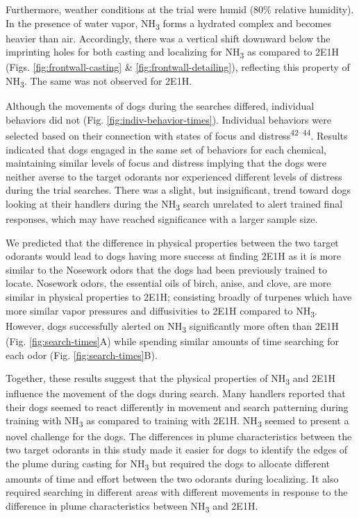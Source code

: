 \documentclass[
]{article}
\begin{document}
Furthermore, weather conditions at the trial were humid (80\% relative humidity). In the presence of water vapor, NH\textsubscript{3} forms a hydrated complex and becomes heavier than air. Accordingly, there was a vertical shift downward below the imprinting holes for both casting and localizing for NH\textsubscript{3} as compared to 2E1H (Figs. \ref{fig:frontwall-casting} \& \ref{fig:frontwall-detailing}), reflecting this property of NH\textsubscript{3}. The same was not observed for 2E1H.

Although the movements of dogs during the searches differed, individual behaviors did not (Fig. \ref{fig:indiv-behavior-times}). Individual behaviors were selected based on their connection with states of focus and distress\textsuperscript{42--44}. Results indicated that dogs engaged in the same set of behaviors for each chemical, maintaining similar levels of focus and distress implying that the dogs were neither averse to the target odorants nor experienced different levels of distress during the trial searches. There was a slight, but insignificant, trend toward dogs looking at their handlers during the NH\textsubscript{3} search unrelated to alert trained final responses, which may have reached significance with a larger sample size.

We predicted that the difference in physical properties between the two target odorants would lead to dogs having more success at finding 2E1H as it is more similar to the Nosework odors that the dogs had been previously trained to locate. Nosework odors, the essential oils of birch, anise, and clove, are more similar in physical properties to 2E1H; consisting broadly of turpenes which have more similar vapor pressures and diffusivities to 2E1H compared to NH\textsubscript{3}. However, dogs successfully alerted on NH\textsubscript{3} significantly more often than 2E1H (Fig. \ref{fig:search-times}A) while spending similar amounts of time searching for each odor (Fig. \ref{fig:search-times}B).

Together, these results suggest that the physical properties of NH\textsubscript{3} and 2E1H influence the movement of the dogs during search. Many handlers reported that their dogs seemed to react differently in movement and search patterning during training with NH\textsubscript{3} as compared to training with 2E1H. NH\textsubscript{3} seemed to present a novel challenge for the dogs. The differences in plume characteristics between the two target odorants in this study made it easier for dogs to identify the edges of the plume during casting for NH\textsubscript{3} but required the dogs to allocate different amounts of time and effort between the two odorants during localizing. It also required searching in different areas with different movements in response to the difference in plume characteristics between NH\textsubscript{3} and 2E1H.
\end{document}
